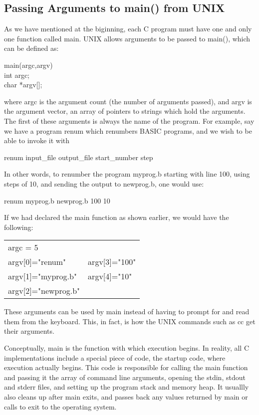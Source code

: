 \subsection{Passing Arguments to {\cd main()} from UNIX}
As we have mentioned at the biginning,
each C program must have one and only one function called {\cd main}.
UNIX allows  arguments to  be passed  to {\cd main()}, which can 
be defined as:
\begin{code}
          main(argc,argv) \\
          int argc; \\
          char *argv[];
\end{code}
\noindent
 where {\cd argc} is  the  argument  count (the number of arguments
passed), and {\cd argv}  is the  argument vector, an array of
pointers to strings which hold the arguments.  The first of these
arguments is  always the  name of  the program.  For example, say  we
have  a program  {\cmd renum} which renumbers BASIC programs, and we
wish to be able to invoke it with
 \begin{display}\ms
{\cmd renum} input\_file output\_file start\_number step
\end{display}
\noindent
     In other  words, to  renumber the program {\fn myprog.b} starting
with line 100, using steps of 10, and sending the output to {\fn
newprog.b}, one would use:
\begin{display}\cmd
renum myprog.b newprog.b 100 10
\end{display}
\noindent
     If we  had declared  the {\cd main}  function as shown earlier, we
would have the following:
\begin{display}\cd
\begin{tabular}{@{}ll@{}}
  argc = 5  & \\
  argv[0]="renum"    &  argv[3]="100" \\
  argv[1]="myprog.b" &  argv[4]="10"  \\
  argv[2]="newprog.b" &
\end{tabular}
\end{display}
\noindent
     These arguments  can be used by {\cd main} instead of having to
prompt for and read them from the keyboard. This, in fact, is how the
UNIX commands such as {\cmd cc} get their arguments.

Conceptually, {\cd main} is the function with which execution begins. 
In
reality, all C implementations include a special piece of code, the
{\kc startup code}, where execution actually begins. 
This code is
responsible for calling the {\cd main} function
and passing it the array of command line arguments, opening the {\cd
stdin}, {\cd stdout} and {\cd stderr} files, and setting up the program
stack and memory heap. It usuallly also cleans up after {\cd main}
exits, and passes back any values returned by {\cd main} or calls to
{\cd exit} to the operating system.

